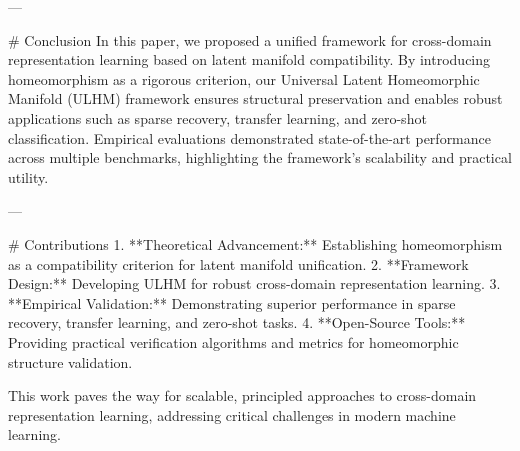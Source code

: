 ---

# Conclusion  
In this paper, we proposed a unified framework for cross-domain representation learning based on latent manifold compatibility. By introducing homeomorphism as a rigorous criterion, our Universal Latent Homeomorphic Manifold (ULHM) framework ensures structural preservation and enables robust applications such as sparse recovery, transfer learning, and zero-shot classification. Empirical evaluations demonstrated state-of-the-art performance across multiple benchmarks, highlighting the framework's scalability and practical utility.

---

# Contributions  
1. **Theoretical Advancement:** Establishing homeomorphism as a compatibility criterion for latent manifold unification.
2. **Framework Design:** Developing ULHM for robust cross-domain representation learning.
3. **Empirical Validation:** Demonstrating superior performance in sparse recovery, transfer learning, and zero-shot tasks.
4. **Open-Source Tools:** Providing practical verification algorithms and metrics for homeomorphic structure validation.

This work paves the way for scalable, principled approaches to cross-domain representation learning, addressing critical challenges in modern machine learning.